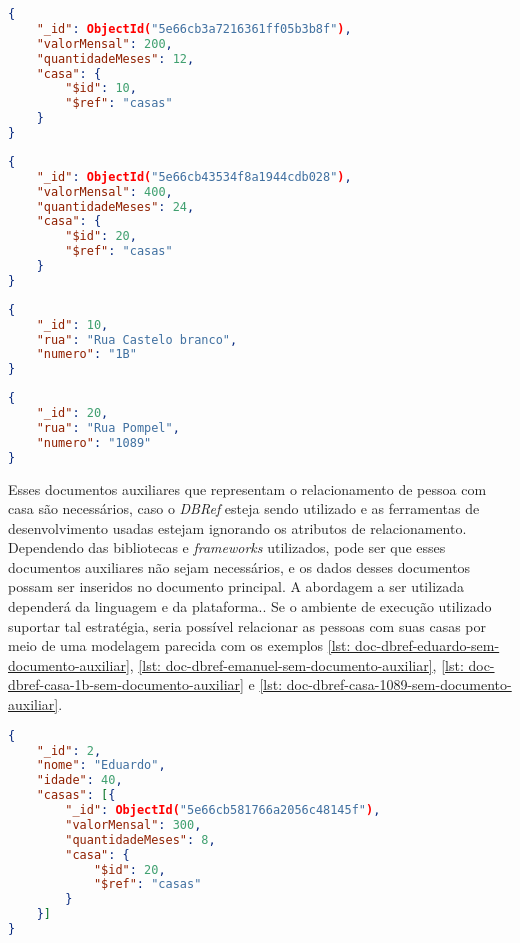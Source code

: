 \begin{lstlisting}[language=json, caption={Relacionamento de \textit{Emanuel} Com Sua Primeira Casa \label{lst: doc-dbref-auxiliar-relacionamento1-emanuel}}]
{
    "_id": ObjectId("5e66cb3a7216361ff05b3b8f"),
    "valorMensal": 200,
    "quantidadeMeses": 12,
    "casa": {
        "$id": 10,
        "$ref": "casas"
    }
}
\end{lstlisting}

\begin{lstlisting}[language=json, caption={Relacionamento de \textit{Emanuel} Com Sua Segunda Casa\label{lst: doc-dbref-auxiliar-relacionamento2-emanuel}}]
{
    "_id": ObjectId("5e66cb43534f8a1944cdb028"),
    "valorMensal": 400,
    "quantidadeMeses": 24,
    "casa": {
        "$id": 20,
        "$ref": "casas"
    }
}
\end{lstlisting}

\newpage

\begin{lstlisting}[language=json, caption={Documento da Casa de Número 1B\label{lst: doc-dbref-auxiliar-casa-1b}}]
{
    "_id": 10,
    "rua": "Rua Castelo branco",
    "numero": "1B"
}
\end{lstlisting}

\begin{lstlisting}[language=json, caption={Documento da Casa de Número 1089\label{lst: doc-dbref-auxiliar-casa-1089}}]
{
    "_id": 20,
    "rua": "Rua Pompel",
    "numero": "1089"
}
\end{lstlisting}

Esses documentos auxiliares que representam o relacionamento de pessoa com casa são necessários, caso o \textit{DBRef} esteja sendo utilizado e as ferramentas de desenvolvimento usadas estejam ignorando os atributos de relacionamento. Dependendo das bibliotecas e \textit{frameworks} utilizados, pode ser que esses documentos auxiliares não sejam necessários, e os dados desses documentos possam ser inseridos no documento principal. A abordagem a ser utilizada dependerá da linguagem e da plataforma.. Se o ambiente de execução utilizado suportar tal estratégia, seria possível relacionar as pessoas com suas casas por meio de uma modelagem parecida com os exemplos \ref{lst: doc-dbref-eduardo-sem-documento-auxiliar}, \ref{lst: doc-dbref-emanuel-sem-documento-auxiliar}, \ref{lst: doc-dbref-casa-1b-sem-documento-auxiliar} e \ref{lst: doc-dbref-casa-1089-sem-documento-auxiliar}.

\begin{lstlisting}[language=json, caption={Documento da Pessoa \textit{Eduardo} Sem Documento Auxiliar\label{lst: doc-dbref-eduardo-sem-documento-auxiliar}}]
{
    "_id": 2,
    "nome": "Eduardo",
    "idade": 40,
    "casas": [{
        "_id": ObjectId("5e66cb581766a2056c48145f"),
        "valorMensal": 300,
        "quantidadeMeses": 8,
        "casa": {
            "$id": 20,
            "$ref": "casas"
        }
    }]
}
\end{lstlisting}

